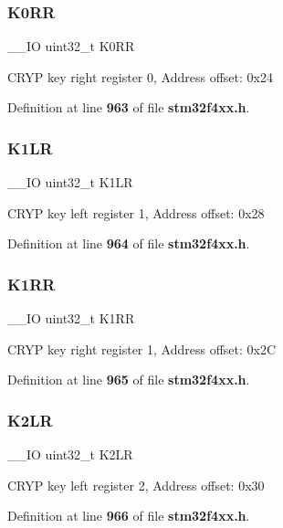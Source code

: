 \subsubsection{K0\+RR}
{\footnotesize\ttfamily \+\_\+\+\_\+\+IO uint32\+\_\+t K0\+RR}

C\+R\+YP key right register 0, Address offset\+: 0x24 

Definition at line \textbf{ 963} of file \textbf{ stm32f4xx.\+h}.

\mbox{\label{structCRYP__TypeDef_a948ff2e2e97978287411fe725dd70a7f}} 
\subsubsection{K1\+LR}
{\footnotesize\ttfamily \+\_\+\+\_\+\+IO uint32\+\_\+t K1\+LR}

C\+R\+YP key left register 1, Address offset\+: 0x28 

Definition at line \textbf{ 964} of file \textbf{ stm32f4xx.\+h}.

\mbox{\label{structCRYP__TypeDef_a7554383cff84540eb260a3fdf55cb934}} 
\subsubsection{K1\+RR}
{\footnotesize\ttfamily \+\_\+\+\_\+\+IO uint32\+\_\+t K1\+RR}

C\+R\+YP key right register 1, Address offset\+: 0x2C 

Definition at line \textbf{ 965} of file \textbf{ stm32f4xx.\+h}.

\mbox{\label{structCRYP__TypeDef_a32210fb9ecbb0b4bd127e688f3f79802}} 
\subsubsection{K2\+LR}
{\footnotesize\ttfamily \+\_\+\+\_\+\+IO uint32\+\_\+t K2\+LR}

C\+R\+YP key left register 2, Address offset\+: 0x30 

Definition at line \textbf{ 966} of file \textbf{ stm32f4xx.\+h}.

